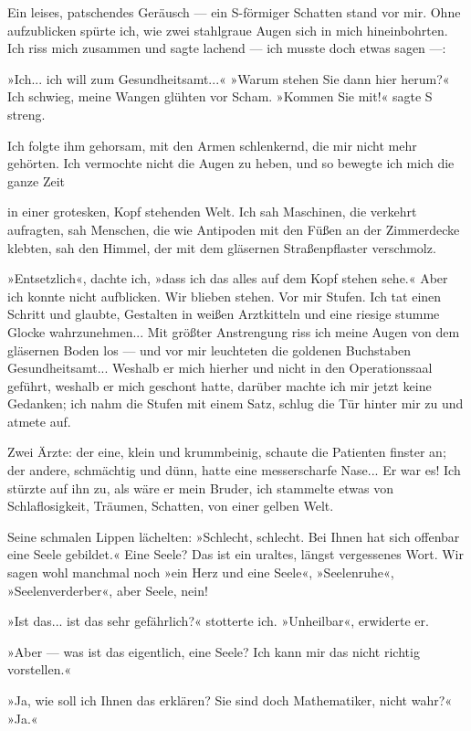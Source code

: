 Ein leises, patschendes Geräusch — ein S-förmiger Schatten stand
vor mir. Ohne aufzublicken spürte ich, wie zwei stahlgraue Augen
sich in mich hineinbohrten. Ich riss mich zusammen und sagte
lachend — ich musste doch etwas sagen —:

»Ich... ich will zum Gesundheitsamt...« »Warum stehen Sie dann hier
herum?« Ich schwieg, meine Wangen glühten vor Scham. »Kommen Sie
mit!« sagte S streng.

Ich folgte ihm gehorsam, mit den Armen schlenkernd, die mir nicht
mehr gehörten. Ich vermochte nicht die Augen zu heben, und so
bewegte ich mich die ganze Zeit

in einer grotesken, Kopf stehenden Welt. Ich sah Maschinen, die
verkehrt aufragten, sah Menschen, die wie Antipoden mit den Füßen
an der Zimmerdecke klebten, sah den Himmel, der mit dem gläsernen
Straßenpflaster verschmolz.

»Entsetzlich«, dachte ich, »dass ich das alles auf dem Kopf stehen
sehe.« Aber ich konnte nicht aufblicken. Wir blieben stehen. Vor
mir Stufen. Ich tat einen Schritt und glaubte, Gestalten in weißen
Arztkitteln und eine riesige stumme Glocke wahrzunehmen... Mit
größter Anstrengung riss ich meine Augen von dem gläsernen Boden
los — und vor mir leuchteten die goldenen Buchstaben
Gesundheitsamt... Weshalb er mich hierher und nicht in den
Operationssaal geführt, weshalb er mich geschont hatte, darüber
machte ich mir jetzt keine Gedanken; ich nahm die Stufen mit einem
Satz, schlug die Tür hinter mir zu und atmete auf.

Zwei Ärzte: der eine, klein und krummbeinig, schaute die Patienten
finster an; der andere, schmächtig und dünn, hatte eine
messerscharfe Nase... Er war es! Ich stürzte auf ihn zu, als wäre
er mein Bruder, ich stammelte etwas von Schlaflosigkeit, Träumen,
Schatten, von einer gelben Welt.

Seine schmalen Lippen lächelten: »Schlecht, schlecht. Bei Ihnen hat
sich offenbar eine Seele gebildet.« Eine Seele? Das ist ein
uraltes, längst vergessenes Wort. Wir sagen wohl manchmal noch »ein
Herz und eine Seele«, »Seelenruhe«, »Seelenverderber«, aber Seele,
nein!

»Ist das... ist das sehr gefährlich?« stotterte ich. »Unheilbar«,
erwiderte er.

»Aber — was ist das eigentlich, eine Seele? Ich kann mir das nicht
richtig vorstellen.«

»Ja, wie soll ich Ihnen das erklären? Sie sind doch Mathematiker,
nicht wahr?« »Ja.«

